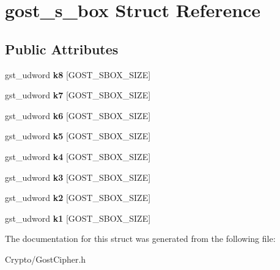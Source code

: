 \hypertarget{structgost__s__box}{}\section{gost\+\_\+s\+\_\+box Struct Reference}
\label{structgost__s__box}
\subsection*{Public Attributes}
\begin{DoxyCompactItemize}
\item 
\mbox{\label{structgost__s__box_a1153f23653fe6a5295960b3936a6ca64}} 
gst\+\_\+udword {\bfseries k8} \mbox{[}G\+O\+S\+T\+\_\+\+S\+B\+O\+X\+\_\+\+S\+I\+ZE\mbox{]}
\item 
\mbox{\label{structgost__s__box_a2e2e32d189f01b95227e4d2e94f42a76}} 
gst\+\_\+udword {\bfseries k7} \mbox{[}G\+O\+S\+T\+\_\+\+S\+B\+O\+X\+\_\+\+S\+I\+ZE\mbox{]}
\item 
\mbox{\label{structgost__s__box_aa0a573638c6f430ed799c4d4910af9ab}} 
gst\+\_\+udword {\bfseries k6} \mbox{[}G\+O\+S\+T\+\_\+\+S\+B\+O\+X\+\_\+\+S\+I\+ZE\mbox{]}
\item 
\mbox{\label{structgost__s__box_a57e0b0f8f9f4685c8f601a7879159637}} 
gst\+\_\+udword {\bfseries k5} \mbox{[}G\+O\+S\+T\+\_\+\+S\+B\+O\+X\+\_\+\+S\+I\+ZE\mbox{]}
\item 
\mbox{\label{structgost__s__box_acd6342b6ed17298aa1008f62a84debff}} 
gst\+\_\+udword {\bfseries k4} \mbox{[}G\+O\+S\+T\+\_\+\+S\+B\+O\+X\+\_\+\+S\+I\+ZE\mbox{]}
\item 
\mbox{\label{structgost__s__box_a80ea31c93e6a6a4fd740b689752c2716}} 
gst\+\_\+udword {\bfseries k3} \mbox{[}G\+O\+S\+T\+\_\+\+S\+B\+O\+X\+\_\+\+S\+I\+ZE\mbox{]}
\item 
\mbox{\label{structgost__s__box_abc5223d9e2adecb65b3927e4567fad0a}} 
gst\+\_\+udword {\bfseries k2} \mbox{[}G\+O\+S\+T\+\_\+\+S\+B\+O\+X\+\_\+\+S\+I\+ZE\mbox{]}
\item 
\mbox{\label{structgost__s__box_afa64cd50a39f63f45d00093c40d71c81}} 
gst\+\_\+udword {\bfseries k1} \mbox{[}G\+O\+S\+T\+\_\+\+S\+B\+O\+X\+\_\+\+S\+I\+ZE\mbox{]}
\end{DoxyCompactItemize}


The documentation for this struct was generated from the following file\+:\begin{DoxyCompactItemize}
\item 
Crypto/Gost\+Cipher.\+h\end{DoxyCompactItemize}
